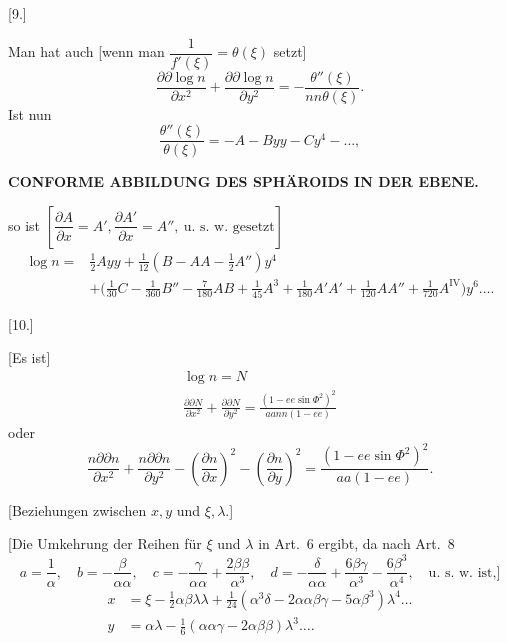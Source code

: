 \begin{center}[9.]\end{center}
Man hat auch [wenn man \(\dfrac{1}{f'(\xi)}=\theta(\xi)\) setzt]
\[
\frac{\partial\partial\log n}{\partial x^2}+\frac{\partial\partial\log n}{\partial y^2}
=-\frac{\theta''(\xi)}{nn\theta(\xi)}.
\]
Ist nun
\[
\frac{\theta''(\xi)}{\theta(\xi)}=-A-Byy-Cy^4-\ldots,
\]

\par\clearpage
\noindent\null\hfill{\small\textbf{CONFORME ABBILDUNG DES SPHÄROIDS IN DER EBENE.}}\hfill{}\par\medskip

\noindent so ist \(\left[\dfrac{\partial A}{\partial x}=A',
\dfrac{\partial A'}{\partial x}=A'',\ \text{u.\ s.\ w.\ gesetzt}\right]\)
\[
\begin{aligned}
\log n={}&\tfrac12Ayy+\tfrac1{12}(B-AA-\tfrac12 A'')y^4\\
 &+\bigl(\tfrac1{30}C-\tfrac1{360}B''-\tfrac7{180}AB+\tfrac1{45}A^3
 +\tfrac1{180}A'A'+\tfrac1{120}AA''+\tfrac1{720}A^{\mathrm{IV}}\bigr)y^6\ldots.
\end{aligned}
\]

\begin{center}[10.]\end{center}
[Es ist]
\[
\begin{gathered}
\log n=N\\
\frac{\partial\partial N}{\partial x^2}+\frac{\partial\partial N}{\partial y^2}
=\frac{(1-ee\sin\Phi^2)^2}{aann(1-ee)}
\end{gathered}
\]
\noindent oder
\[
\frac{n\partial\partial n}{\partial x^2}+\frac{n\partial\partial n}{\partial y^2}
-\left(\frac{\partial n}{\partial x}\right)^2-\left(\frac{\partial n}{\partial y}\right)^2
=\frac{(1-ee\sin\Phi^2)^2}{aa(1-ee)}.
\]

\begin{center}
[Beziehungen zwischen \(x,y\) und \(\xi,\lambda\).]\par\medskip
[11.]
\end{center}
[Die Umkehrung der Reihen für \(\xi\) und \(\lambda\) in Art.\ 6 ergibt, da nach Art.\ 8
\[
a=\frac1\alpha,\quad b=-\frac{\beta}{\alpha\alpha},\quad
c=-\frac{\gamma}{\alpha\alpha}+\frac{2\beta\beta}{\alpha^3},\quad
d=-\frac{\delta}{\alpha\alpha}+\frac{6\beta\gamma}{\alpha^3}
-\frac{6\beta^3}{\alpha^4},\quad\text{u.\ s.\ w.\ ist,]}
\]
\[
\begin{aligned}
x&=\xi-\tfrac12\alpha\beta\lambda\lambda
+\tfrac1{24}(\alpha^3\delta-2\alpha\alpha\beta\gamma-5\alpha\beta^3)\lambda^4\ldots\\
y&=\alpha\lambda-\tfrac16(\alpha\alpha\gamma-2\alpha\beta\beta)\lambda^3\ldots.
\end{aligned}
\]

